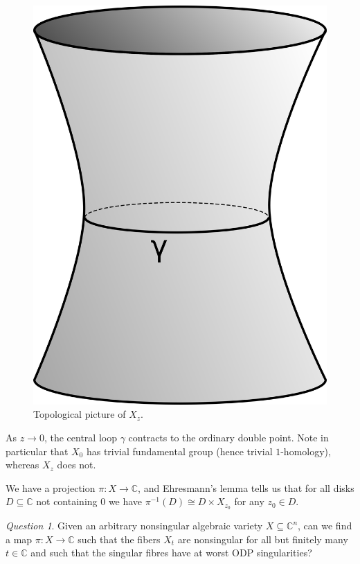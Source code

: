 \documentclass[12pt]{article}
\theoremstyle{darkgreentheorem}
\theoremstyle{darkbluedefinition}
\theoremstyle{darkredexample}
\theoremstyle{remark}
\newtheorem{q}[thm]{Question}
\newcommand{\1}{\mathbbm{1}}
\newcommand{\C}{\mathbb{C}}
\begin{document}
\begin{figure}[h]
    \centering
    \includegraphics[scale=.8]{smoothfiber}
    \caption{Topological picture of $X_{z}$.}
    \label{fig:smoothfibre}
\end{figure}

As $z\to 0$, the central loop $\gamma$ contracts to the ordinary double point.
Note in particular that $X_{0}$ has trivial fundamental group (hence trivial $1$-homology), whereas $X_{z}$ does not.

We have a projection $\pi\colon X\to \C$, and Ehresmann's lemma tells us that for all disks $D\subseteq \C$ not containing $0$ we have $\pi^{-1}(D)\cong D\times X_{z_{0}}$ for any $z_{0}\in D$.

\begin{q}
    Given an arbitrary nonsingular algebraic variety $X\subseteq \C^{n}$, can we find a map $\pi\colon X\to \C$ such that the fibers $X_{t}$ are nonsingular for all but finitely many $t\in \C$ and such that the singular fibres have at worst ODP singularities?
\end{q}
\end{document}
